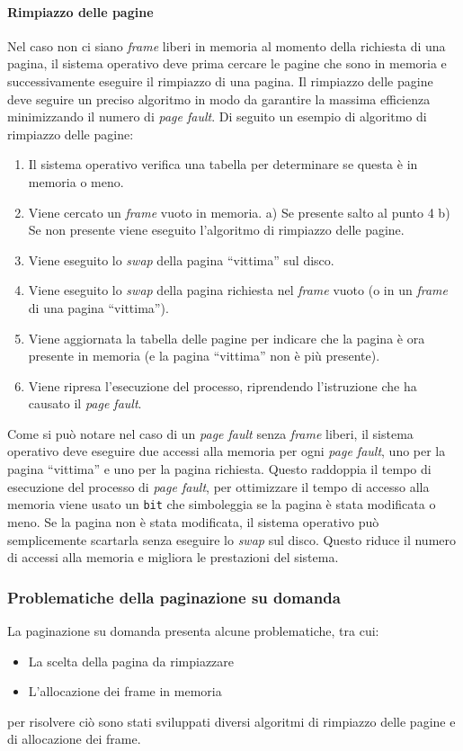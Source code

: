         \paragraph{Rimpiazzo delle pagine}
            Nel caso non ci siano \textit{frame} liberi in memoria al momento della richiesta di una pagina, il sistema operativo deve prima cercare le pagine che sono in memoria e successivamente eseguire il rimpiazzo di una pagina. Il rimpiazzo delle pagine deve seguire un preciso algoritmo in modo da garantire la massima efficienza minimizzando il numero di \textit{page fault}. Di seguito un esempio di algoritmo di rimpiazzo delle pagine:
            \begin{enumerate}
                \item Il sistema operativo verifica una tabella per determinare se questa è in memoria o meno.
                \item Viene cercato un \textit{frame} vuoto in memoria.
                \subitem a) Se presente salto al punto 4
                \subitem b) Se non presente viene eseguito l'algoritmo di rimpiazzo delle pagine.
                \item Viene eseguito lo \textit{swap} della pagina ``vittima'' sul disco.
                \item Viene eseguito lo \textit{swap} della pagina richiesta nel \textit{frame} vuoto (o in un \textit{frame} di una pagina ``vittima'').
                \item Viene aggiornata la tabella delle pagine per indicare che la pagina è ora presente in memoria (e la pagina ``vittima'' non è più presente).
                \item Viene ripresa l'esecuzione del processo, riprendendo l'istruzione che ha causato il \textit{page fault}.
            \end{enumerate} 
            Come si può notare nel caso di un \textit{page fault} senza \textit{frame} liberi, il sistema operativo deve eseguire due accessi alla memoria per ogni \textit{page fault}, uno per la pagina ``vittima'' e uno per la pagina richiesta. Questo raddoppia il tempo di esecuzione del processo di \textit{page fault}, per ottimizzare il tempo di accesso alla memoria viene usato un \texttt{bit} che simboleggia se la pagina è stata modificata o meno. Se la pagina non è stata modificata, il sistema operativo può semplicemente scartarla senza eseguire lo \textit{swap} sul disco. Questo riduce il numero di accessi alla memoria e migliora le prestazioni del sistema. 
    \subsubsection{Problematiche della paginazione su domanda}
        La paginazione su domanda presenta alcune problematiche, tra cui:
        \begin{itemize}
            \item La scelta della pagina da rimpiazzare
            \item L'allocazione dei frame in memoria
        \end{itemize}
        per risolvere ciò sono stati sviluppati diversi algoritmi di rimpiazzo delle pagine e di allocazione dei frame.
